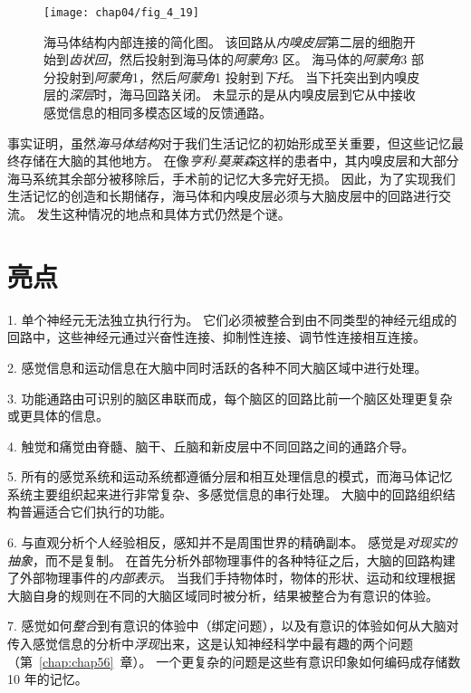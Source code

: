 \begin{figure}[htbp]
	\centering
	\texttt{[image: chap04/fig\_4\_19]}
	\caption{海马体结构内部连接的简化图。 
		该回路从\textit{内嗅皮层}第二层的细胞开始到\textit{齿状回}，然后投射到海马体的\textit{阿蒙角}3 区。
		海马体的\textit{阿蒙角}3 部分投射到\textit{阿蒙角}1，然后\textit{阿蒙角}1 投射到\textit{下托}。
		当下托突出到内嗅皮层的\textit{深层}时，海马回路关闭。
		未显示的是从内嗅皮层到它从中接收感觉信息的相同多模态区域的反馈通路。}
	\label{fig:4_19}
\end{figure}


事实证明，虽然\textit{海马体结构}对于我们生活记忆的初始形成至关重要，但这些记忆最终存储在大脑的其他地方。
在像\textit{亨利$\cdot$莫莱森}这样的患者中，其内嗅皮层和大部分海马系统其余部分被移除后，手术前的记忆大多完好无损。
因此，为了实现我们生活记忆的创造和长期储存，海马体和内嗅皮层必须与大脑皮层中的回路进行交流。
发生这种情况的地点和具体方式仍然是个谜。



\section{亮点}

1. 单个神经元无法独立执行行为。
它们必须被整合到由不同类型的神经元组成的回路中，这些神经元通过兴奋性连接、抑制性连接、调节性连接相互连接。


2. 感觉信息和运动信息在大脑中同时活跃的各种不同大脑区域中进行处理。


3. 功能通路由可识别的脑区串联而成，每个脑区的回路比前一个脑区处理更复杂或更具体的信息。


4. 触觉和痛觉由脊髓、脑干、丘脑和新皮层中不同回路之间的通路介导。


5. 所有的感觉系统和运动系统都遵循分层和相互处理信息的模式，而海马体记忆系统主要组织起来进行非常复杂、多感觉信息的串行处理。
大脑中的回路组织结构普遍适合它们执行的功能。


6. 与直观分析个人经验相反，感知并不是周围世界的精确副本。
感觉是\textit{对现实的抽象}，而不是复制。
在首先分析外部物理事件的各种特征之后，大脑的回路构建了外部物理事件的\textit{内部表示}。
当我们手持物体时，物体的形状、运动和纹理根据大脑自身的规则在不同的大脑区域同时被分析，结果被整合为有意识的体验。


7. 感觉如何\textit{整合}到有意识的体验中（绑定问题），以及有意识的体验如何从大脑对传入感觉信息的分析中\textit{浮现}出来，这是认知神经科学中最有趣的两个问题（第~\ref{chap:chap56}~章）。
一个更复杂的问题是这些有意识印象如何编码成存储数 10 年的记忆。
























